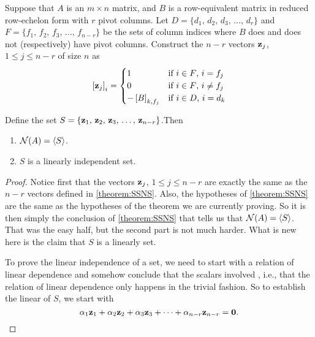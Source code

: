 \documentclass{ximera}
\begin{document}
\begin{theorem}
  \label{theorem:BNS}

  Suppose that $A$ is an $m\times n$ matrix, and $B$ is a
  row-equivalent matrix in reduced row-echelon form with $r$ pivot
  columns.  Let $D=\{d_1,\,d_2,\,d_3,\,\ldots,\,d_r\}$ and
  $F=\{f_1,\,f_2,\,f_3,\,\ldots,\,f_{n-r}\}$ be the sets of column
  indices where $B$ does and does not (respectively) have pivot
  columns.  Construct the $n-r$ vectors $\mathbf{z}_j$,
  $1\leq j\leq n-r$ of size $n$ as
  \[
    \left\lbrack\mathbf{z}_j\right\rbrack_{i}=
    \begin{cases}
      1&\text{if $i\in F$, $i=f_j$}\\
      0&\text{if $i\in F$, $i\neq f_j$}\\
      -\left\lbrack B\right\rbrack_{k,f_j}&\text{if $i\in D$, $i=d_k$}
    \end{cases}
  \]

  Define the set $S=\left\{\mathbf{z}_{1},\,\mathbf{z}_{2},\,\mathbf{z}_{3},\,\ldots,\,\mathbf{z}_{n-r}\right\}$.Then
  \begin{enumerate}
  \item $\mathcal{N}\!\left(A\right)=\left\langle S\right\rangle$.
  \item $S$ is a linearly independent set.
  \end{enumerate}

\begin{proof}
  Notice first that the vectors $\mathbf{z}_j$, $1\leq j\leq n-r$ are
  exactly the same as the $n-r$ vectors defined in \ref{theorem:SSNS}.
  Also, the hypotheses of \ref{theorem:SSNS} are the same as the
  hypotheses of the theorem we are currently proving.  So it is then
  simply the conclusion of \ref{theorem:SSNS} that tells us that
  $\mathcal{N}\!\left(A\right)=\left\langle S\right\rangle$.  That was the easy half, but the second part is
  not much harder.  What is new here is the claim that $S$ is a
  linearly
   set.

  To prove the linear independence of a set, we need to start with a
  relation of linear dependence and somehow conclude that the scalars
  involved , i.e., that the relation of linear dependence
  only happens in the trivial fashion.  So to establish the linear
   of
  $S$, we start with
  \[
    \alpha_{1}\mathbf{z}_{1}+\alpha_{2}\mathbf{z}_{2}+\alpha_{3}\mathbf{z}_{3}+\cdots +\alpha_{n-r}\mathbf{z}_{n-r}=\mathbf{0}.
  \]


\end{proof}
\end{theorem}
\end{document}
